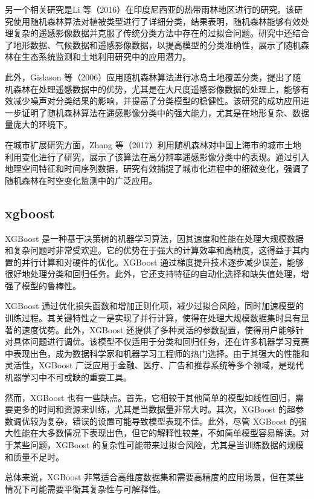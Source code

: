 \documentclass[AutoFakeBold]{LZUThesis-PgD&PhD}
\begin{document}
另一个相关研究是Li 等（2016）在印度尼西亚的热带雨林地区进行的研究。该研究使用随机森林算法对植被类型进行了详细分类，结果表明，随机森林能够有效处理复杂的遥感影像数据并克服了传统分类方法中存在的过拟合问题\cite{li2016}。研究中还结合了地形数据、气候数据和遥感影像数据，以提高模型的分类准确性，展示了随机森林在生态系统监测和土地利用研究中的应用潜力。

此外，Gislason 等（2006）应用随机森林算法进行冰岛土地覆盖分类，提出了随机森林在处理遥感数据中的优势，尤其是在大尺度遥感影像数据的处理上，能够有效减少噪声对分类结果的影响，并提高了分类模型的稳健性\cite{gislason2006}。该研究的成功应用进一步证明了随机森林算法在遥感影像分类中的强大能力，尤其是在地形复杂、数据量庞大的环境下。

在城市扩展研究方面，Zhang 等（2017）利用随机森林对中国上海市的城市土地利用变化进行了研究，展示了该算法在高分辨率遥感影像分类中的表现\cite{zhang2017}。通过引入地理空间特征和时间序列数据，研究有效捕捉了城市化进程中的细微变化，强调了随机森林在时空变化监测中的广泛应用。


\subsection{xgboost}
XGBoost 是一种基于决策树的机器学习算法，因其速度和性能在处理大规模数据和复杂问题时非常受欢迎。它的优势在于强大的计算效率和高精度，这得益于其内置的并行计算和对硬件的优化。XGBoost 通过梯度提升技术逐步减少误差，能够很好地处理分类和回归任务。此外，它还支持特征的自动化选择和缺失值处理，增强了模型的鲁棒性。

XGBoost 通过优化损失函数和增加正则化项，减少过拟合风险，同时加速模型的训练过程。其关键特性之一是实现了并行计算，使得在处理大规模数据集时具有显著的速度优势。此外，XGBoost 还提供了多种灵活的参数配置，使得用户能够针对具体问题进行调优。该模型不仅适用于分类和回归任务，还在许多机器学习竞赛中表现出色，成为数据科学家和机器学习工程师的热门选择。由于其强大的性能和灵活性，XGBoost 广泛应用于金融、医疗、广告和推荐系统等多个领域，是现代机器学习中不可或缺的重要工具。

然而，XGBoost 也有一些缺点。首先，它相较于其他简单的模型如线性回归，需要更多的时间和资源来训练，尤其是当数据量非常大时。其次，XGBoost 的超参数调优较为复杂，错误的设置可能导致模型表现不佳。此外，尽管 XGBoost 的强大性能在大多数情况下表现出色，但它的解释性较差，不如简单模型容易解读。对于某些问题，XGBoost 的复杂性可能带来过拟合风险，尤其是当训练数据的规模和质量不足时。

总体来说，XGBoost 非常适合高维度数据集和需要高精度的应用场景，但在某些情况下可能需要平衡其复杂性与可解释性。
\end{document}

